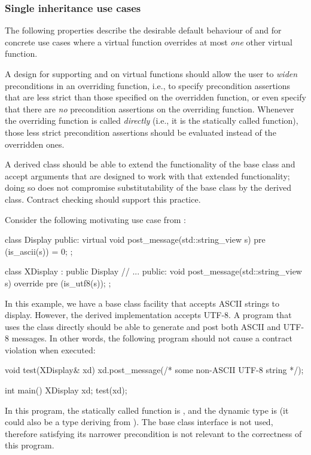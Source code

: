 \subsubsection{Single inheritance use cases}

The following properties describe the desirable default behaviour of  and  for concrete use cases where a virtual function overrides at most \emph{one} other virtual function.


A design for supporting  and  on virtual functions should allow the user to \emph{widen} preconditions in an overriding function, i.e., to specify precondition assertions that are less strict than those specified on the overridden function, or even specify that there are \emph{no} precondition assertions on the overriding function. Whenever the overriding function is called \emph{directly} (i.e., it is the statically called function), those less strict precondition assertions should be evaluated instead of the overridden ones.

A derived class should be able to extend the functionality of the base class and accept arguments that are designed to work with that extended functionality; doing so does not compromise substitutability of the base class by the derived class. Contract checking should support this practice.

Consider the following motivating use case from \cite{P0247R0}:
\begin{codeblock}
class Display {
public:
  virtual void post_message(std::string_view s)
     pre (is_ascii(s)) = 0;
};

class XDisplay : public Display {
   // ...
public:
  void post_message(std::string_view s) override
    pre (is_utf8(s));
 };
\end{codeblock}
In this example, we have a base class facility that accepts ASCII strings to display. However, the derived implementation accepts UTF-8. A program that uses the  class directly should be able to generate and post both ASCII and UTF-8 messages. In other words, the following program should not cause a contract violation when executed:
\begin{codeblock}
void test(XDisplay& xd) {
  xd.post_message(/* some non-ASCII UTF-8 string */);
}

int main() {
  XDisplay xd;
  test(xd);
}
\end{codeblock}
In this program, the statically called function is , and the dynamic type is  (it could also be a type deriving from ). The base class interface  is not used, therefore satisfying its narrower precondition is not relevant to the correctness of this program.

